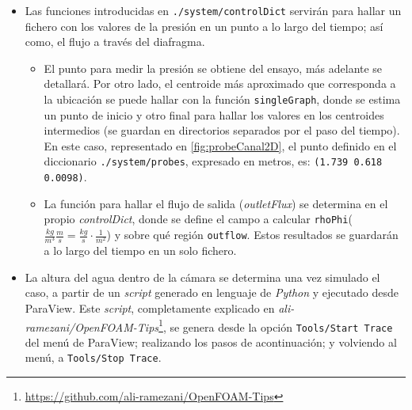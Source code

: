 \begin{itemize}
  \begin{itemize}
  \item
    Las funciones introducidas en
    \lstinline[style=bash]{./system/controlDict} servirán para hallar
    un fichero con los valores de la presión en un punto a lo largo del
    tiempo; así como, el flujo a través del diafragma.

    \begin{itemize}
    \item
      El punto para medir la presión se obtiene del ensayo, más adelante
      se detallará. Por otro lado, el centroide más aproximado que
      corresponda a la ubicación se puede hallar con la función
      \texttt{singleGraph}, donde se estima un punto de inicio y otro
      final para hallar los valores en los centroides intermedios (se
      guardan en directorios separados por el paso del tiempo). En este
      caso, representado en \autoref{fig:probeCanal2D}, el punto definido en el diccionario
      \lstinline[style=bash]{./system/probes}, expresado en metros, es:
      \lstinline[style=bash]{(1.739 0.618 0.0098)}.



    \item
      La función para hallar el flujo de salida (\emph{outletFlux}) se
      determina en el propio \emph{controlDict}, donde se define el
      campo a calcular
      \texttt{rhoPhi}(\(\frac {kg}{m^3} \frac {m}{s}= \frac {kg}{s} \cdot \frac {1}{m^2}\))
      y sobre qué región \texttt{outflow}. Estos resultados se guardarán
      a lo largo del tiempo en un solo fichero.
    \end{itemize}
  \item
    La altura del agua dentro de la cámara se determina una vez simulado
    el caso, a partir de un \emph{script} generado en lenguaje de
    \emph{Python} y ejecutado desde ParaView. Este \emph{script},
    completamente explicado en \emph{ali-ramezani/OpenFOAM-Tips}\footnote{\url{https://github.com/ali-ramezani/OpenFOAM-Tips}},
    se genera desde la opción \lstinline[style=bash]{Tools/Start Trace} del menú de
    ParaView; realizando los pasos de acontinuación; y volviendo al
    menú, a \lstinline[style=bash]{Tools/Stop Trace}.


\end{itemize}
\end{itemize}

